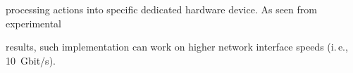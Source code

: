 processing actions into specific dedicated hardware device. As seen from experimental 


results, such implementation can work on higher network interface speeds (i.\,e., 10~Gbit/s).


































\def\leftkol{\ } %


\def\rightkol{\ } %








\def\tit{NONLINEAR CORRELATIONAL MODELING AND~AFTERSALE 


PRODUCT SERVICE SYSTEMS RELIABILITY ANALYSIS}





\def\aut{I.\,N.~Sinitsyn$^1$, A.\,S.~Shalamov$^2$, and~A.\,A.~Kuleshov$^3$} 








\def\auf{$^1$IPI RAN, sinitsin@dol.ru\\[1pt]


$^2$IPI RAN, a-shal5@yandex.ru\\[1pt]


$^3$IPI RAN, nordixsi@gmail.com}





\def\leftkol{ENGLISH ABSTRACTS}





\def\rightkol{ENGLISH ABSTRACTS}





